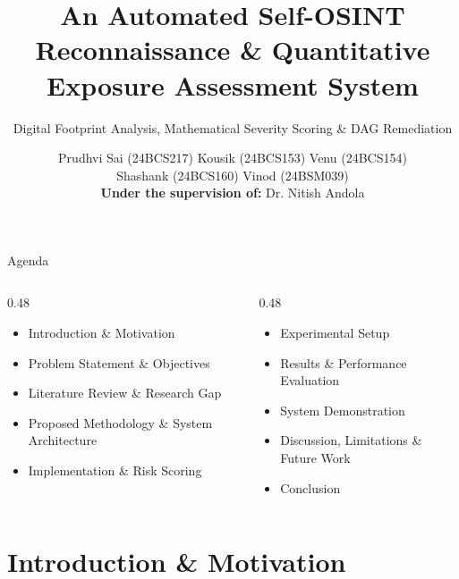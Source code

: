 \documentclass[aspectratio=169,10pt]{beamer}
\title[DigiZafe: Automated OSINT \& Risk Platform]{An Automated Self-OSINT Reconnaissance \& Quantitative Exposure Assessment System}
\subtitle{Digital Footprint Analysis, Mathematical Severity Scoring \& DAG Remediation}
\author[Prudhvi Sai et al.]{Prudhvi Sai (24BCS217) \quad Kousik (24BCS153) \quad Venu (24BCS154)\\ Shashank (24BCS160) \quad Vinod (24BSM039)\\ \vspace{0.3em} \scriptsize{\textbf{Under the supervision of:} Dr. Nitish Andola}}
\institute[PDPM IIITDM Jabalpur]{Department of Computer Science and Engineering\\ PDPM IIITDM Jabalpur}
\date{} %
\begin{document}
\begin{frame}
  \titlepage
\end{frame}

\begin{frame}{Agenda}
  \large
  \vspace{0.2cm}
  \begin{columns}[T]
    \begin{column}{0.48\textwidth}
      \begin{itemize}\setlength{\itemsep}{0.25cm}
        \item Introduction \& Motivation
        \item Problem Statement \& Objectives
        \item Literature Review \& Research Gap
        \item Proposed Methodology \& System Architecture
        \item Implementation \& Risk Scoring
      \end{itemize}
    \end{column}
    \begin{column}{0.48\textwidth}
      \begin{itemize}\setlength{\itemsep}{0.25cm}
        \item Experimental Setup
        \item Results \& Performance Evaluation
        \item System Demonstration
        \item Discussion, Limitations \& Future Work
        \item Conclusion
      \end{itemize}
    \end{column}
  \end{columns}
\end{frame}

\section{Introduction \& Motivation}
\end{document}

